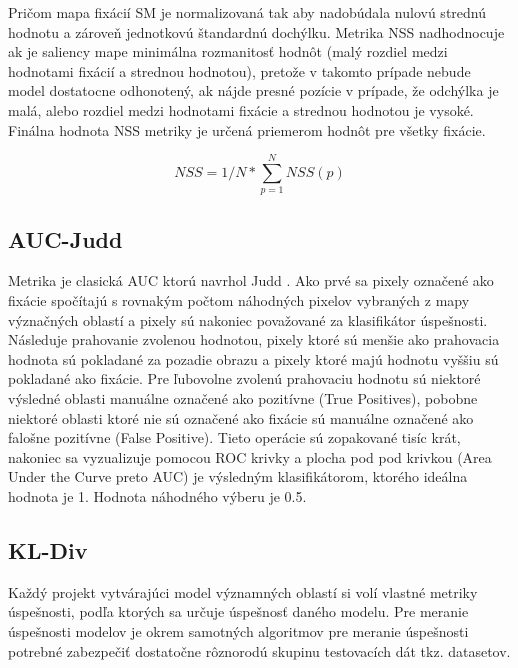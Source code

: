 Pričom mapa fixácií SM je normalizovaná tak aby nadobúdala nulovú strednú hodnotu a zároveň jednotkovú štandardnú dochýlku.
Metrika NSS nadhodnocuje ak je saliency mape minimálna rozmanitosť hodnôt (malý rozdiel medzi hodnotami fixácií a strednou hodnotou), pretože v takomto prípade nebude model dostatocne odhonotený, ak nájde presné pozície v prípade, že odchýlka je malá, alebo
rozdiel medzi hodnotami fixácie a strednou hodnotou je vysoké.
Finálna hodnota NSS metriky je určená priemerom hodnôt pre všetky fixácie\cite{metrics-1}.

\begin{equation}
  NSS = 1/N * \sum_{p=1}^{N}NSS(p)
\end{equation}

\subsection{AUC-Judd}
Metrika je clasická AUC ktorú navrhol Judd \cite{auc-judd}.
Ako prvé sa pixely označené ako fixácie spočítajú s rovnakým počtom náhodných pixelov vybraných z mapy význačných oblastí a pixely sú nakoniec považované za klasifikátor úspešnosti.
Následuje prahovanie zvolenou hodnotou, pixely ktoré sú menšie ako prahovacia hodnota sú pokladané za pozadie obrazu a pixely ktoré majú hodnotu vyššiu sú pokladané ako fixácie.
Pre ľubovolne zvolenú prahovaciu hodnotu sú niektoré výsledné oblasti manuálne označené ako pozitívne (True Positives), pobobne niektoré oblasti ktoré nie sú označené ako fixácie sú manuálne označené ako falošne pozitívne (False Positive).
Tieto operácie sú zopakované tisíc krát, nakoniec sa vyzualizuje pomocou ROC krivky a plocha pod pod krivkou (Area Under the Curve preto AUC) je výsledným klasifikátorom, ktorého ideálna hodnota je 1.
Hodnota náhodného výberu je 0.5.

\subsection{KL-Div}

Každý projekt vytvárajúci model významných oblastí si volí vlastné metriky úspešnosti, podľa ktorých sa určuje úspešnosť daného modelu.
Pre meranie úspešnosti modelov je okrem samotných algoritmov pre meranie úspešnosti potrebné zabezpečiť dostatočne rôznorodú skupinu testovacích dát tkz.
datasetov.

